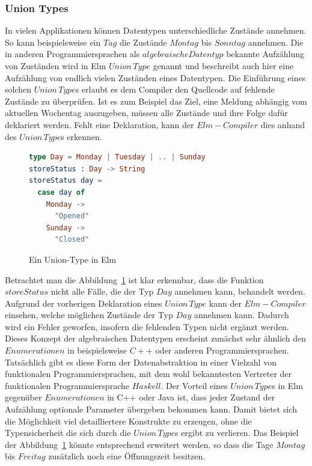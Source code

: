 \subsubsection{Union Types}
\label{sec:Union-Types}
In vielen Applikationen können Datentypen unterschiedliche Zustände annehmen. So kann beispielsweise ein $Tag$ die Zustände $Montag$ bis $Sonntag$ annehmen. Die in anderen Programmiersprachen als $algebraische Datentyp$ bekannte Aufzählung von Zuständen wird in Elm $Union\,Type$ genannt und beschreibt auch hier eine Aufzählung von endlich vielen Zuständen eines Datentypen. Die Einführung eines solchen $Union\,Type$s erlaubt es dem Compiler den Quellcode auf fehlende Zustände zu überprüfen. Ist es zum Beispiel das Ziel, eine Meldung abhängig vom aktuellen Wochentag auszugeben, müssen alle Zustände und ihre Folge dafür deklariert werden. Fehlt eine Deklaration, kann der $Elm-Compiler$ dies anhand des $Union\,Type$s erkennen.
\begin{figure}[h]
\begin{lstlisting}[language=Elm]
type Day = Monday | Tuesday | .. | Sunday
storeStatus : Day -> String
storeStatus day =
  case day of
    Monday ->
      "Opened"
    Sunday ->
      "Closed"
\end{lstlisting}
\caption{Ein Union-Type in Elm}\label{fig:elm-union-type}
\end{figure}
Betrachtet man die Abbildung~\ref{fig:elm-union-type} ist klar erkennbar, dass die Funktion $storeStatus$ nicht alle Fälle, die der Typ $Day$ annehmen kann, behandelt werden. Aufgrund der vorherigen Deklaration eines $Union\,Type$ kann der $Elm-Compiler$ einsehen, welche möglichen Zustände der Typ $Day$ annehmen kann. Dadurch wird ein Fehler geworfen, insofern die fehlenden Typen nicht ergänzt werden. Dieses Konzept der algebraischen Datentypen erscheint zunächst sehr ähnlich den $Enumerationen$ in beispielsweise $C++$ oder anderen Programmiersprachen. Tatsächlich gibt es diese Form der Datenabstraktion in einer Vielzahl von funktionalen Programmiersprachen, mit dem wohl bekanntesten Vertreter der funktionalen Programmiersprache $Haskell$. Der Vorteil eines $Union\,Type$s in Elm gegenüber $Enumerationen$ in C++ oder Java ist, dass jeder Zustand der Aufzählung optionale Parameter übergeben bekommen kann. Damit bietet sich die Möglichkeit viel detailliertere Konstrukte zu erzeugen, ohne die Typensicherheit die sich durch die $Union\,Type$s ergibt zu verlieren. Das Beispiel der Abbildung~\ref{fig:elm-union-type} könnte entsprechend erweitert werden, so dass die Tage $Montag$ bis $Freitag$ zusätzlich noch eine Öffnungszeit besitzen.

